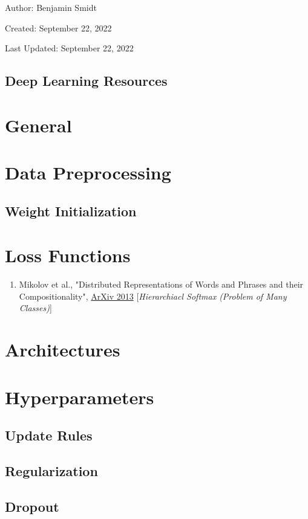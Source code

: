 \documentclass[12pt]{article}
\begin{document}
\noindent Author: Benjamin Smidt

\noindent Created: September 22, 2022

\noindent Last Updated: September 22, 2022
\begin{center}
\section*{Deep Learning Resources}
\end{center}

\tableofcontents{}

\section{General}

\section{Data Preprocessing}

\subsection{Weight Initialization}

\section{Loss Functions}
\begin{enumerate}
\item Mikolov et al., 
    "Distributed Representations of Words and Phrases and their
    Compositionality", 
    \href{https://arxiv.org/abs/1310.4546}{ArXiv 2013}
    [\emph{Hierarchiacl Softmax (Problem of Many Classes)}]
\end{enumerate}


\section{Architectures}

\section{Hyperparameters}
\subsection{Update Rules}

\subsection{Regularization}

\subsection{Dropout}
\end{document}
